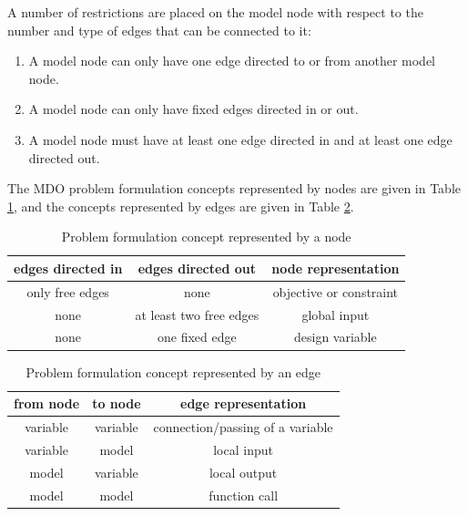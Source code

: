 A number of restrictions are placed on the model node with respect to the number and 
type of edges that can be connected to it: 
\begin{enumerate}
\item A model node can only have one edge directed to or from another model node.
\item A model node can only have fixed edges directed in or out.
\item A model node must have at least one edge directed in and at least one edge directed out.
\end{enumerate}

The MDO problem formulation concepts represented by nodes are given in 
Table \ref{t:node representation}, and the concepts represented by edges are 
given in Table \ref{t:edge representation}.
\begin{table}[h!]
 \begin{center}
  \caption{Problem formulation concept represented by a node}
  \label{t:node representation}
  \begin{tabular}{ccc} \hline 
edges directed in & edges directed out & node representation \\ \hline
only free edges & none & objective or constraint\\
none & at least two free edges & global input \\
none & one fixed edge & design variable \\ \hline
  \end{tabular}
 \end{center}
 \vspace{-15pt}
\end{table}
\begin{table}[h!]
 \begin{center}
  \caption{Problem formulation concept represented by an edge}
  \label{t:edge representation}
  \begin{tabular}{ccc} \hline 
from node & to node & edge representation \\ \hline
variable & variable & connection/passing of a variable\\
variable & model & local input \\
model & variable & local output \\
model & model & function call \\ \hline
  \end{tabular}
 \end{center}
 \vspace{-15pt}
\end{table}


